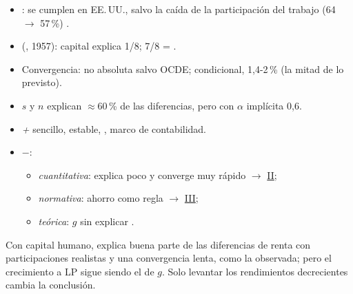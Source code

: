\documentclass{article}
\begin{document}
\begin{columnas}
\begin{itemize}
\item {}: se cumplen en EE.\,UU., salvo la caída de la participación del trabajo (64 $\to$ 57\,\%) .
\item {} (, 1957): capital explica 1/8; 7/8 = .
\item Convergencia: no absoluta salvo OCDE; condicional, 1,4-2\,\% (la mitad de lo previsto).
\item $s$ y $n$ explican $\approx$60\,\% de las diferencias, pero con $\alpha$ implícita 0,6.
\end{itemize}
\begin{itemize}
\item \emph{+} sencillo, estable, , marco de contabilidad.
\item \emph{$-$}:
  \begin{itemize}
  \item \emph{cuantitativa}: explica poco y converge muy rápido $\to$ \hyperref[rep:II]{II};
  \item \emph{normativa}: ahorro como regla $\to$ \hyperref[rep:III]{III};
  \item \emph{teórica}: $g$ sin explicar .
  \end{itemize}
\end{itemize}

\begin{ideaclave}
Con capital humano,  explica buena parte de las diferencias de renta con participaciones realistas y una convergencia lenta, como la observada; pero el crecimiento a LP sigue siendo el de $g$. Solo levantar los rendimientos decrecientes cambia la conclusión.
\end{ideaclave}


\end{columnas}
\end{document}

